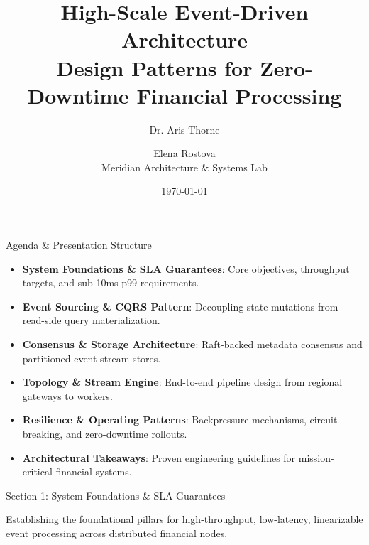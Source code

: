 \documentclass[
  style=simple,
  size=11pt,
  paper=screen,
  orient=landscape
]{powerdot}
\title{High-Scale Event-Driven Architecture\\[0.4em]\normalsize\mdseries Design Patterns for Zero-Downtime Financial Processing}
\author{Dr. Aris Thorne \and Elena Rostova\\[0.3em]\small Meridian Architecture \& Systems Lab}
\date{\today}
\begin{document}
\maketitle

\begin{slide}{Agenda \& Presentation Structure}
\begin{itemize}
  \item \textbf{System Foundations \& SLA Guarantees}: Core objectives, throughput targets, and sub-10ms p99 requirements.
  \item \textbf{Event Sourcing \& CQRS Pattern}: Decoupling state mutations from read-side query materialization.
  \item \textbf{Consensus \& Storage Architecture}: Raft-backed metadata consensus and partitioned event stream stores.
  \item \textbf{Topology \& Stream Engine}: End-to-end pipeline design from regional gateways to workers.
  \item \textbf{Resilience \& Operating Patterns}: Backpressure mechanisms, circuit breaking, and zero-downtime rollouts.
  \item \textbf{Architectural Takeaways}: Proven engineering guidelines for mission-critical financial systems.
\end{itemize}
\end{slide}

\begin{wideslide}{Section 1: System Foundations \& SLA Guarantees}
\vspace{1.5em}
\begin{tcolorbox}[monobox,title=Architectural Core Focus]
Establishing the foundational pillars for high-throughput, low-latency, linearizable event processing across distributed financial nodes.
\end{tcolorbox}
\end{wideslide}
\end{document}
